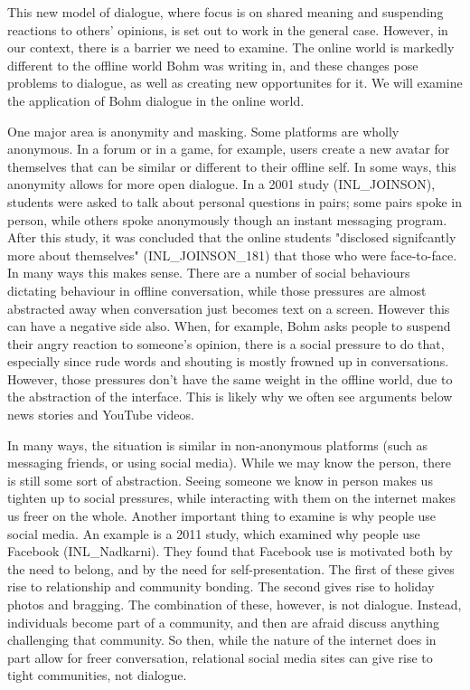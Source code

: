 \documentclass[]{article}
\begin{document}
This new model of dialogue, where focus is on shared meaning and
suspending reactions to others' opinions, is set out to work in the
general case. However, in our context, there is a barrier we need to
examine. The online world is markedly different to the offline world
Bohm was writing in, and these changes pose problems to dialogue, as
well as creating new opportunites for it. We will examine the
application of Bohm dialogue in the online world.

One major area is anonymity and masking. Some platforms are wholly
anonymous. In a forum or in a game, for example, users create a new
avatar for themselves that can be similar or different to their offline
self. In some ways, this anonymity allows for more open dialogue. In a
2001 study (INL\_JOINSON), students were asked to talk about personal
questions in pairs; some pairs spoke in person, while others spoke
anonymously though an instant messaging program. After this study, it
was concluded that the online students "disclosed signifcantly more
about themselves" (INL\_JOINSON\_181) that those who were face-to-face.
In many ways this makes sense. There are a number of social behaviours
dictating behaviour in offline conversation, while those pressures are
almost abstracted away when conversation just becomes text on a screen.
However this can have a negative side also. When, for example, Bohm asks
people to suspend their angry reaction to someone's opinion, there is a
social pressure to do that, especially since rude words and shouting is
mostly frowned up in conversations. However, those pressures don't have
the same weight in the offline world, due to the abstraction of the
interface. This is likely why we often see arguments below news stories
and YouTube videos.

In many ways, the situation is similar in non-anonymous platforms (such
as messaging friends, or using social media). While we may know the
person, there is still some sort of abstraction. Seeing someone we know
in person makes us tighten up to social pressures, while interacting
with them on the internet makes us freer on the whole. Another important
thing to examine is why people use social media. An example is a 2011
study, which examined why people use Facebook (INL\_Nadkarni). They
found that Facebook use is motivated both by the need to belong, and by
the need for self-presentation. The first of these gives rise to
relationship and community bonding. The second gives rise to holiday
photos and bragging. The combination of these, however, is not dialogue.
Instead, individuals become part of a community, and then are afraid
discuss anything challenging that community. So then, while the nature
of the internet does in part allow for freer conversation, relational
social media sites can give rise to tight communities, not dialogue.
\end{document}

